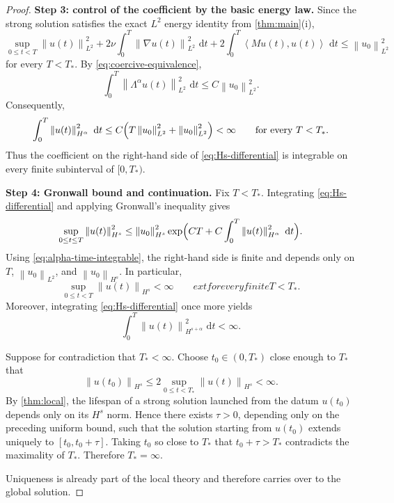 \documentclass[10pt,a4paper]{amsart}
\newcommand{\dd}{\,\mathrm{d}}
\newcommand{\ip}[2]{\left\langle #1,#2\right\rangle}
\newcommand{\norm}[1]{\left\lVert #1\right\rVert}
\begin{document}
\begin{proof}
\smallskip
\noindent\textbf{Step 3: control of the coefficient by the basic energy law.}
Since the strong solution satisfies the exact $L^2$ energy identity from \cref{thm:main}(i),
\begin{equation}\label{eq:lions-basic-energy}
\sup_{0\le t<T}\norm{u(t)}_{L^2}^2
+2\nu\int_0^T\norm{\nabla u(t)}_{L^2}^2\,\dd t
+2\int_0^T\ip{Mu(t)}{u(t)}\,\dd t
\le \norm{u_0}_{L^2}^2
\end{equation}
for every $T<T_*$. By \eqref{eq:coercive-equivalence},
\[
\int_0^T \norm{\Lambda^\alpha u(t)}_{L^2}^2\,\dd t
\le C\norm{u_0}_{L^2}^2.
\]
Consequently,
\begin{equation}\label{eq:alpha-time-integrable}
\int_0^T \norm{u(t)}_{H^\alpha}^2\,\dd t
\le C\Bigl(T\norm{u_0}_{L^2}^2+\norm{u_0}_{L^2}^2\Bigr)
<\infty
\qquad\text{for every }T<T_*.
\end{equation}
Thus the coefficient on the right-hand side of \eqref{eq:Hs-differential} is integrable on every finite subinterval of $[0,T_*)$.

\smallskip
\noindent\textbf{Step 4: Gronwall bound and continuation.}
Fix $T<T_*$. Integrating \eqref{eq:Hs-differential} and applying Gronwall's inequality gives
\begin{equation}\label{eq:Hs-global-bound}
\sup_{0\le t\le T}\norm{u(t)}_{H^s}^2
\le
\norm{u_0}_{H^s}^2
\exp\Bigl(C T + C\int_0^T\norm{u(t)}_{H^\alpha}^2\,\dd t\Bigr).
\end{equation}
Using \eqref{eq:alpha-time-integrable}, the right-hand side is finite and depends only on $T$, $\norm{u_0}_{L^2}$, and $\norm{u_0}_{H^s}$. In particular,
\[
\sup_{0\le t<T}\norm{u(t)}_{H^s}<\infty
\qquad	ext{for every finite }T<T_*.
\]
Moreover, integrating \eqref{eq:Hs-differential} once more yields
\[
\int_0^T\norm{u(t)}_{H^{s+\alpha}}^2\,\dd t<\infty.
\]

Suppose for contradiction that $T_*<\infty$. Choose $t_0\in(0,T_*)$ close enough to $T_*$ that
\[
\norm{u(t_0)}_{H^s}\le 2\sup_{0\le t<T_*}\norm{u(t)}_{H^s}<\infty.
\]
By \cref{thm:local}, the lifespan of a strong solution launched from the datum $u(t_0)$ depends only on its $H^s$ norm. Hence there exists $\tau>0$, depending only on the preceding uniform bound, such that the solution starting from $u(t_0)$ extends uniquely to $[t_0,t_0+\tau]$. Taking $t_0$ so close to $T_*$ that $t_0+\tau>T_*$ contradicts the maximality of $T_*$. Therefore $T_*=\infty$.

Uniqueness is already part of the local theory and therefore carries over to the global solution.
\end{proof}
\end{document}
